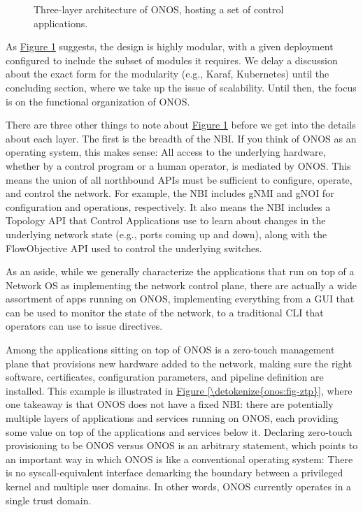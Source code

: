 \documentclass[letterpaper,11pt,english]{sphinxmanual}
\let\sphinxpxdimen\pdfpxdimen\else\newdimen\sphinxpxdimen
\begin{document}
\begin{figure}[htbp]
\centering
\capstart

\noindent\sphinxincludegraphics[width=700\sphinxpxdimen]{{Slide26}.png}
\caption{Three-layer architecture of ONOS, hosting a set of control
applications.}\label{\detokenize{onos:id5}}\label{\detokenize{onos:fig-onos}}\end{figure}

As \hyperref[\detokenize{onos:fig-onos}]{Figure \ref{\detokenize{onos:fig-onos}}} suggests, the design is highly
modular, with a given deployment configured to include the subset of
modules it requires. We delay a discussion about the exact form for
the modularity (e.g., Karaf, Kubernetes) until the concluding section,
where we take up the issue of scalability. Until then, the focus is
on the functional organization of ONOS.

There are three other things to note about \hyperref[\detokenize{onos:fig-onos}]{Figure \ref{\detokenize{onos:fig-onos}}} before we get into the details about each layer. The first
is the breadth of the NBI. If you think of ONOS as an operating
system, this makes sense: All access to the underlying hardware,
whether by a control program or a human operator, is mediated by
ONOS. This means the union of all northbound APIs must be sufficient
to configure, operate, and control the network. For example, the NBI
includes gNMI and gNOI for configuration and operations,
respectively. It also means the NBI includes a Topology API that
Control Applications use to learn about changes in the underlying
network state (e.g., ports coming up and down), along with the
FlowObjective API used to control the underlying switches.

As an aside, while we generally characterize the applications that run
on top of a Network OS as implementing the network control plane,
there are actually a wide assortment of apps running on ONOS,
implementing everything from a GUI that can be used to monitor the
state of the network, to a traditional CLI that operators can use to
issue directives.

Among the applications sitting on top of ONOS is a zero-touch
management plane that provisions new hardware added to the network,
making sure the right software, certificates, configuration
parameters, and pipeline definition are installed. This example is
illustrated in \hyperref[\detokenize{onos:fig-ztp}]{Figure \ref{\detokenize{onos:fig-ztp}}}, where one takeaway is
that ONOS does not have a fixed NBI: there are potentially multiple
layers of applications and services running on ONOS, each providing
some value on top of the applications and services below it. Declaring
zero-touch provisioning to be  ONOS versus  ONOS is an
arbitrary statement, which points to an important way in which ONOS is
 like a conventional operating system: There is no
syscall-equivalent interface demarking the boundary between a
privileged kernel and multiple user domains. In other words, ONOS
currently operates in a single trust domain.
\end{document}
